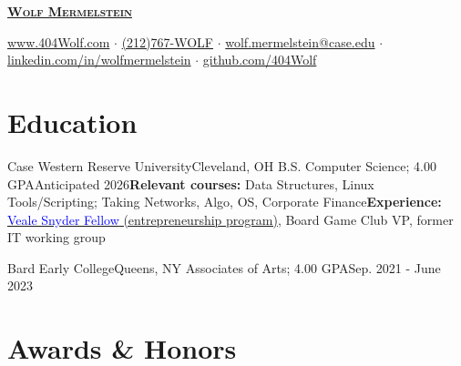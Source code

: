 \documentclass[letterpaper, 10pt]{article}
\begin{document}


\begin{center}
	\textbf{\Huge \scshape \href{https://404wolf.com}{Wolf Mermelstein}} \\ \vspace{4pt}

	\href{https://404wolf.com}{www.404Wolf.com}
	$\cdot$
	\small \href{tel:(+12127679653)}{(212)767-WOLF}
	$\cdot$
	\href{mailto:wolf.mermelstein@case.edu}{wolf.mermelstein@case.edu}
	$\cdot$
	\href{https://linkedin.com/in/wolfmermelstein}{linkedin.com/in/wolfmermelstein}
	$\cdot$
	\href{https://github.com/404wolf}{github.com/404Wolf}
\end{center}
\vspace{-16px}

\section{Education}
\resumeSubHeadingListStart
\resumeSubheadingCompact
{Case Western Reserve University}{Cleveland, OH}
{B.S. Computer Science; 4.00 GPA}{Anticipated 2026}{\textbf{Relevant courses:} Data Structures, Linux Tools/Scripting; Taking Networks, Algo, OS, Corporate Finance}{\textbf{Experience:} \href{https://case.edu/entrepreneurship/fellowships/veale-snyder-fellows-program}{\textcolor{blue}{Veale Snyder Fellow} (entrepreneurship program)}, Board Game Club VP, former IT working group}

\vspace{3.5pt}

\resumeSubheadingCompact
{Bard Early College}{Queens, NY}
{Associates of Arts;  4.00 GPA}{Sep. 2021 - June 2023}{}{}
\resumeSubHeadingListEnd

\section{Awards \& Honors}
\resumeSubHeadingListStart

\end{document}
